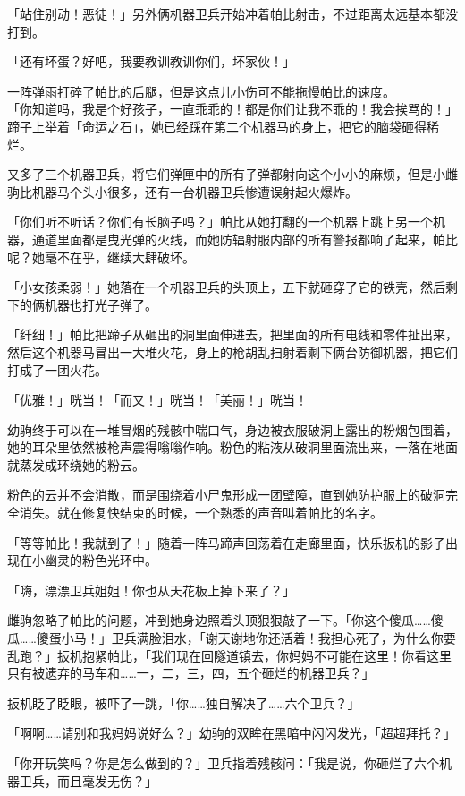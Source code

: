 「站住别动！恶徒！」另外俩机器卫兵开始冲着帕比射击，不过距离太远基本都没打到。

「还有坏蛋？好吧，我要教训教训你们，坏家伙！」

一阵弹雨打碎了帕比的后腿，但是这点儿小伤可不能拖慢帕比的速度。\\「你知道吗，我是个好孩子，一直乖乖的！都是你们让我不乖的！我会挨骂的！」蹄子上举着「命运之石」，她已经踩在第二个机器马的身上，把它的脑袋砸得稀烂。



又多了三个机器卫兵，将它们弹匣中的所有子弹都射向这个小小的麻烦，但是小雌驹比机器马个头小很多，还有一台机器卫兵惨遭误射起火爆炸。

「你们听不听话？你们有长脑子吗？」帕比从她打翻的一个机器上跳上另一个机器，通道里面都是曳光弹的火线，而她防辐射服内部的所有警报都响了起来，帕比呢？她毫不在乎，继续大肆破坏。

「小女孩柔弱！」她落在一个机器卫兵的头顶上，五下就砸穿了它的铁壳，然后剩下的俩机器也打光子弹了。

「纤细！」帕比把蹄子从砸出的洞里面伸进去，把里面的所有电线和零件扯出来，然后这个机器马冒出一大堆火花，身上的枪胡乱扫射着剩下俩台防御机器，把它们打成了一团火花。

「优雅！」咣当！「而又！」咣当！「美丽！」咣当！

幼驹终于可以在一堆冒烟的残骸中喘口气，身边被衣服破洞上露出的粉烟包围着，她的耳朵里依然被枪声震得嗡嗡作响。粉色的粘液从破洞里面流出来，一落在地面就蒸发成环绕她的粉云。

粉色的云并不会消散，而是围绕着小尸鬼形成一团壁障，直到她防护服上的破洞完全消失。就在修复快结束的时候，一个熟悉的声音叫着帕比的名字。

「等等帕比！我就到了！」随着一阵马蹄声回荡着在走廊里面，快乐扳机的影子出现在小幽灵的粉色光环中。

「嗨，漂漂卫兵姐姐！你也从天花板上掉下来了？」

雌驹忽略了帕比的问题，冲到她身边照着头顶狠狠敲了一下。「你这个傻瓜……傻瓜……傻蛋小马！」卫兵满脸泪水，「谢天谢地你还活着！我担心死了，为什么你要乱跑？」扳机抱紧帕比，「我们现在回隧道镇去，你妈妈不可能在这里！你看这里只有被遗弃的马车和……一，二，三，四，五个砸烂的机器卫兵？」

扳机眨了眨眼，被吓了一跳，「你……独自解决了……六个卫兵？」

「啊啊……请别和我妈妈说好么？」幼驹的双眸在黑暗中闪闪发光，「超超拜托？」

「你开玩笑吗？你是怎么做到的？」卫兵指着残骸问：「我是说，你砸烂了六个机器卫兵，而且毫发无伤？」

